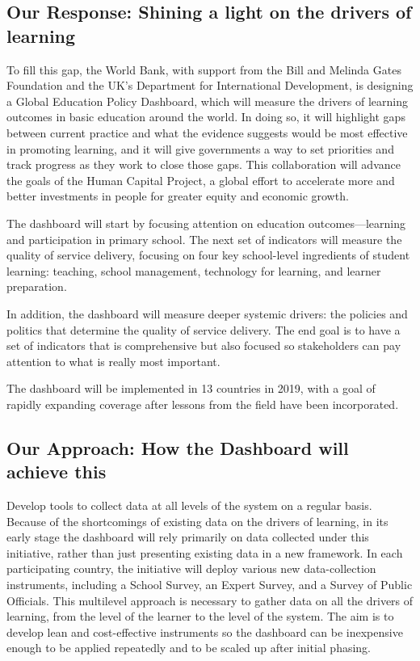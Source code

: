 \documentclass[]{article}
\begin{document}
\hypertarget{our-response-shining-a-light-on-the-drivers-of-learning}{%
\subsection{Our Response: Shining a light on the drivers of
learning}\label{our-response-shining-a-light-on-the-drivers-of-learning}}

To fill this gap, the World Bank, with support from the Bill and Melinda
Gates Foundation and the UK's Department for International Development,
is designing a Global Education Policy Dashboard, which will measure the
drivers of learning outcomes in basic education around the world. In
doing so, it will highlight gaps between current practice and what the
evidence suggests would be most effective in promoting learning, and it
will give governments a way to set priorities and track progress as they
work to close those gaps. This collaboration will advance the goals of
the Human Capital Project, a global effort to accelerate more and better
investments in people for greater equity and economic growth.

The dashboard will start by focusing attention on education
outcomes---learning and participation in primary school. The next set of
indicators will measure the quality of service delivery, focusing on
four key school-level ingredients of student learning: teaching, school
management, technology for learning, and learner preparation.

In addition, the dashboard will measure deeper systemic drivers: the
policies and politics that determine the quality of service delivery.
The end goal is to have a set of indicators that is comprehensive but
also focused so stakeholders can pay attention to what is really most
important.

The dashboard will be implemented in 13 countries in 2019, with a goal
of rapidly expanding coverage after lessons from the field have been
incorporated.

\hypertarget{our-approach-how-the-dashboard-will-achieve-this}{%
\subsection{Our Approach: How the Dashboard will achieve
this}\label{our-approach-how-the-dashboard-will-achieve-this}}

Develop tools to collect data at all levels of the system on a regular
basis. Because of the shortcomings of existing data on the drivers of
learning, in its early stage the dashboard will rely primarily on data
collected under this initiative, rather than just presenting existing
data in a new framework. In each participating country, the initiative
will deploy various new data-collection instruments, including a School
Survey, an Expert Survey, and a Survey of Public Officials. This
multilevel approach is necessary to gather data on all the drivers of
learning, from the level of the learner to the level of the system. The
aim is to develop lean and cost-effective instruments so the dashboard
can be inexpensive enough to be applied repeatedly and to be scaled up
after initial phasing.
\end{document}

